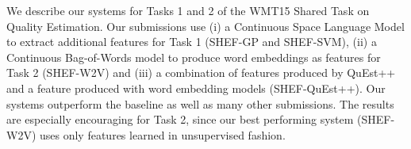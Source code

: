 We describe our systems for Tasks 1 and 2 of the WMT15 Shared Task on Quality Estimation. Our submissions use (i) a Continuous Space Language Model to extract additional features for Task 1 (SHEF-GP and SHEF-SVM), (ii) a Continuous Bag-of-Words model to produce word embeddings as features for Task 2 (SHEF-W2V) and (iii) a combination of features produced by QuEst++ and a feature produced with word embedding models (SHEF-QuEst++).   Our systems outperform the baseline as well as many other submissions.  The results are especially encouraging for Task 2, since our best performing system (SHEF-W2V) uses only features learned in unsupervised fashion.
